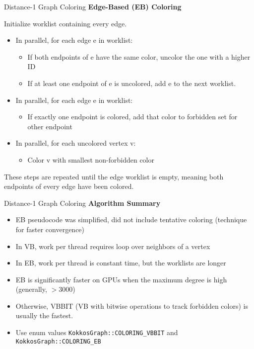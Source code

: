 \begin{frame}[fragile]{Distance-1 Graph Coloring}
\textbf{Edge-Based (EB) Coloring}

Initialize worklist containing every edge.
\begin{itemize}
  \item In parallel, for each edge e in worklist:
  \begin{itemize}
    \item If both endpoints of e have the same color, uncolor the one with a higher ID
    \item If at least one endpoint of e is uncolored, add e to the next worklist.
  \end{itemize}
  \item In parallel, for each edge e in worklist:
  \begin{itemize}
    \item If exactly one endpoint is colored, add that color to forbidden set for other endpoint
  \end{itemize}
  \item In parallel, for each uncolored vertex v:
  \begin{itemize}
    \item Color v with smallest non-forbidden color
  \end{itemize}
\end{itemize}
These steps are repeated until the edge worklist is empty, meaning both endpoints of every edge have been colored.
\end{frame}

\begin{frame}[fragile]{Distance-1 Graph Coloring}
\textbf{Algorithm Summary}

\begin{itemize}
  \item EB pseudocode was simplified, did not include tentative coloring (technique for faster convergence)
  \item In VB, work per thread requires loop over neighbors of a vertex
  \item In EB, work per thread is constant time, but the worklists are longer
  \item EB is significantly faster on GPUs when the maximum degree is high (generally, $> 3000$)
  \item Otherwise, VBBIT (VB with bitwise operations to track forbidden colors) is usually the fastest.
  \item Use enum values \verb!KokkosGraph::COLORING_VBBIT! and \verb!KokkosGraph::COLORING_EB! 
\end{itemize}
\end{frame}


